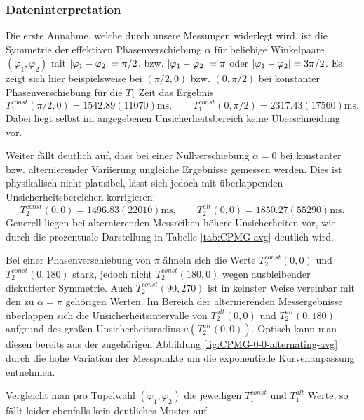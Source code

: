 \documentclass[../../main.tex]{subfiles}
\begin{document}
        \subsubsection*{Dateninterpretation}
            Die erste Annahme, welche durch unsere Messungen widerlegt wird, ist die Symmetrie der effektiven Phasenverschiebung $\alpha$ für beliebige Winkelpaare $(\varphi_1,\varphi_2)$ mit $\abs{\varphi_1 - \varphi_2} = \pi/2$, bzw. $\abs{\varphi_1 - \varphi_2} = \pi$ oder $\abs{\varphi_1 - \varphi_2} = 3\pi/2$. Es zeigt sich hier beispielsweise bei $(\pi/2,0)$ bzw. $(0,\pi/2)$ bei konstanter Phasenverschiebung für die $T_1$ Zeit das Ergebnis
            \[
                T_1^{\textit{const}}(\pi/2,0) = 1542.89(11070)\si{\ms},\qquad T_1^{\textit{const}}(0,\pi/2) = 2317.43(17560)\si{\ms}.
            \]
            Dabei liegt selbst im angegebenen Unsicherheitsbereich keine Überschneidung vor. 

            Weiter fällt deutlich auf, dass bei einer Nullverschiebung $\alpha = 0$ bei konstanter bzw. alternierender Variierung ungleiche Ergebnisse gemessen werden. Dies ist physikalisch nicht plausibel, lässt sich jedoch mit überlappenden Unsicherheitsbereichen korrigieren:
            \[
                T_2^{\textit{const}}(0,0) = 1496.83(22010)\si{\ms},\qquad T_2^{\textit{alt}}(0,0) = 1850.27(55290)\si{\ms}.
            \]
            Generell liegen bei alternierenden Messreihen höhere Unsicherheiten vor, wie durch die prozentuale Darstellung in Tabelle \ref{tab:CPMG-avg} deutlich wird. 

            Bei einer Phasenverschiebung von $\pi$ ähneln sich die Werte $T_2^{\textit{const}}(0,0)$ und $T_2^{\textit{const}}(0,180)$ stark, jedoch nicht $T_2^{\textit{const}}(180,0)$ wegen ausbleibender diskutierter Symmetrie. Auch $T_2^{\textit{const}}(90,270)$ ist in keinster Weise vereinbar mit den zu $\alpha = \pi$ gehörigen Werten. Im Bereich der alternierenden Messergebnisse überlappen sich die Unsicherheitsintervalle von $T_2^{\textit{alt}}(0,0)$ und $T_2^{\textit{alt}}(0,180)$ aufgrund des großen Unsicherheitsradius $u(T_2^{\textit{alt}}(0,0))$. Optisch kann man diesen bereits aus der zugehörigen Abbildung \ref{fig:CPMG-0-0-alternating-avg} durch die hohe Variation der Messpunkte um die exponentielle Kurvenanpassung entnehmen.
            
            Vergleicht man pro Tupelwahl $(\varphi_1,\varphi_2)$ die jeweiligen $T_1^{\textit{const}}$ und $T_1^{\textit{alt}}$ Werte, so fällt leider ebenfalls kein deutliches Muster auf. 
\end{document}
